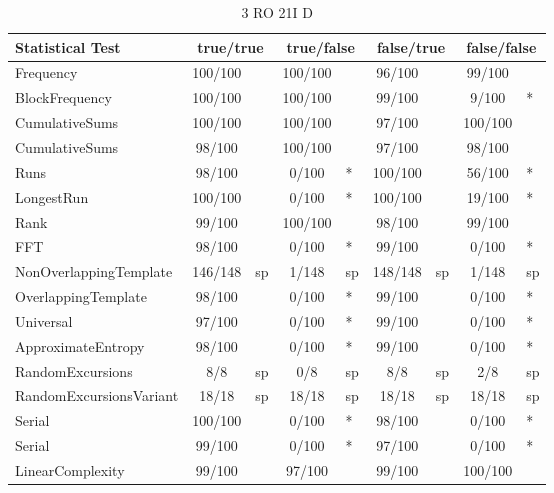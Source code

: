 \begin{table}[H]
\centering
\caption{3 RO 21I D}
\label{tab:nist_22_3RO_21I_D}
\begin{tabular}{|l|c|l|c|l|c|l|c|l|}
\hline
\textbf{Statistical Test} & \multicolumn{2}{c|}{\textbf{true/true}} & \multicolumn{2}{c|}{\textbf{true/false}} & \multicolumn{2}{c|}{\textbf{false/true}} & \multicolumn{2}{c|}{\textbf{false/false}} \\ \hline
Frequency               & 100/100 &     & 100/100 &     &  96/100 &     &  99/100 &     \\ \hline
BlockFrequency          & 100/100 &     & 100/100 &     &  99/100 &     &   9/100 & *   \\ \hline
CumulativeSums          & 100/100 &     & 100/100 &     &  97/100 &     & 100/100 &     \\ \hline
CumulativeSums          &  98/100 &     & 100/100 &     &  97/100 &     &  98/100 &     \\ \hline
Runs                    &  98/100 &     &   0/100 & *   & 100/100 &     &  56/100 & *   \\ \hline
LongestRun              & 100/100 &     &   0/100 & *   & 100/100 &     &  19/100 & *   \\ \hline
Rank                    &  99/100 &     & 100/100 &     &  98/100 &     &  99/100 &     \\ \hline
FFT                     &  98/100 &     &   0/100 & *   &  99/100 &     &   0/100 & *   \\ \hline
NonOverlappingTemplate  & 146/148 & sp  &   1/148 & sp  & 148/148 & sp  &   1/148 & sp  \\ \hline
OverlappingTemplate     &  98/100 &     &   0/100 & *   &  99/100 &     &   0/100 & *   \\ \hline
Universal               &  97/100 &     &   0/100 & *   &  99/100 &     &   0/100 & *   \\ \hline
ApproximateEntropy      &  98/100 &     &   0/100 & *   &  99/100 &     &   0/100 & *   \\ \hline
RandomExcursions        &     8/8 & sp  &     0/8 & sp  &     8/8 & sp  &     2/8 & sp  \\ \hline
RandomExcursionsVariant &   18/18 & sp  &   18/18 & sp  &   18/18 & sp  &   18/18 & sp  \\ \hline
Serial                  & 100/100 &     &   0/100 & *   &  98/100 &     &   0/100 & *   \\ \hline
Serial                  &  99/100 &     &   0/100 & *   &  97/100 &     &   0/100 & *   \\ \hline
LinearComplexity        &  99/100 &     &  97/100 &     &  99/100 &     & 100/100 &     \\ \hline
\end{tabular}
\end{table}


